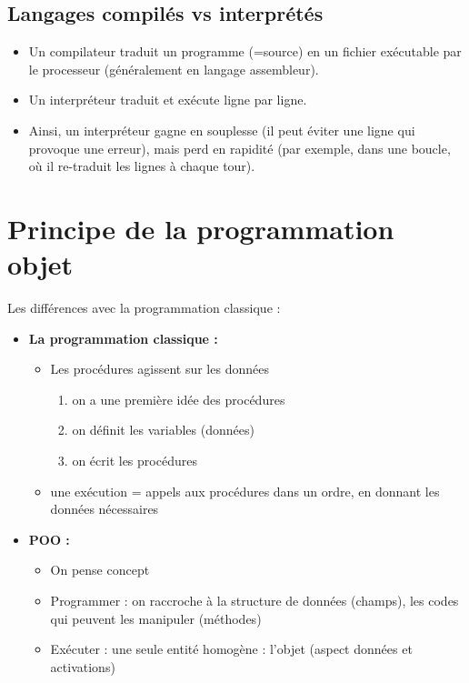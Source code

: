 \documentclass{article}
\begin{document}
\subsection{Langages compilés vs interprétés}

\begin{itemize}
	\item Un compilateur traduit un programme (=source) en un fichier exécutable
		par le processeur (généralement en langage assembleur).
	\item Un interpréteur traduit et exécute ligne par ligne.
	\item Ainsi, un interpréteur gagne en souplesse 
		(il peut éviter une ligne qui provoque une erreur), 
		mais perd en rapidité (par exemple, dans une boucle, 
		où il re-traduit les lignes à chaque tour). 
\end{itemize}



\section{Principe de la programmation objet}

Les différences avec la programmation classique :

\begin{itemize}
	\item \textbf{La programmation classique :}
		\begin{itemize}
			\item Les procédures agissent sur les données
				\begin{enumerate}
					\item on a une première idée des procédures
					\item on définit les variables (données)
					\item on écrit les procédures
				\end{enumerate}
			\item une exécution = appels aux procédures dans un ordre,
				en donnant les données nécessaires
		\end{itemize}
	\item \textbf{POO :}
		\begin{itemize}
			\item On pense concept
			\item Programmer : on raccroche à la structure de données (champs), 
				les codes qui peuvent les manipuler (méthodes)
			\item Exécuter : une seule entité homogène : l'objet 
				(aspect données et activations) 
		\end{itemize}
\end{itemize}
\end{document}
